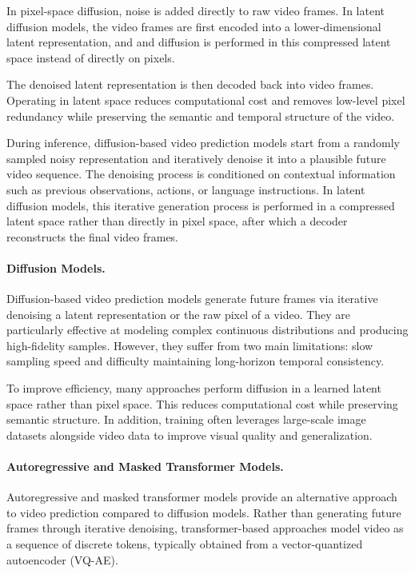 In pixel-space diffusion, noise is added directly to raw video frames. In latent diffusion models, the video frames are first encoded into a lower-dimensional latent representation, and and diffusion is performed in this compressed latent space instead of directly on pixels. 

The denoised latent representation is then decoded back into video frames. Operating in latent space reduces computational cost and removes low-level pixel redundancy while preserving the semantic and temporal structure of the video.


During inference, diffusion-based video prediction models start from a randomly sampled noisy representation and iteratively denoise it into a plausible future video sequence. The denoising process is conditioned on contextual information such as previous observations, actions, or language instructions. In latent diffusion models, this iterative generation process is performed in a compressed latent space rather than directly in pixel space, after which a decoder reconstructs the final video frames.




\paragraph{Diffusion Models.}
Diffusion-based video prediction models generate future frames via iterative denoising a latent representation or the raw pixel of a video. They are particularly effective at modeling complex continuous distributions and producing high-fidelity samples. However, they suffer from two main limitations: slow sampling speed and difficulty maintaining long-horizon temporal consistency.

To improve efficiency, many approaches perform diffusion in a learned latent space rather than pixel space. This reduces computational cost while preserving semantic structure. In addition, training often leverages large-scale image datasets alongside video data to improve visual quality and generalization.






\paragraph{Autoregressive and Masked Transformer Models.}
Autoregressive and masked transformer models provide an alternative approach to video prediction compared to diffusion models. Rather than generating future frames through iterative denoising, transformer-based approaches model video as a sequence of discrete tokens, typically obtained from a vector-quantized autoencoder (VQ-AE). 

